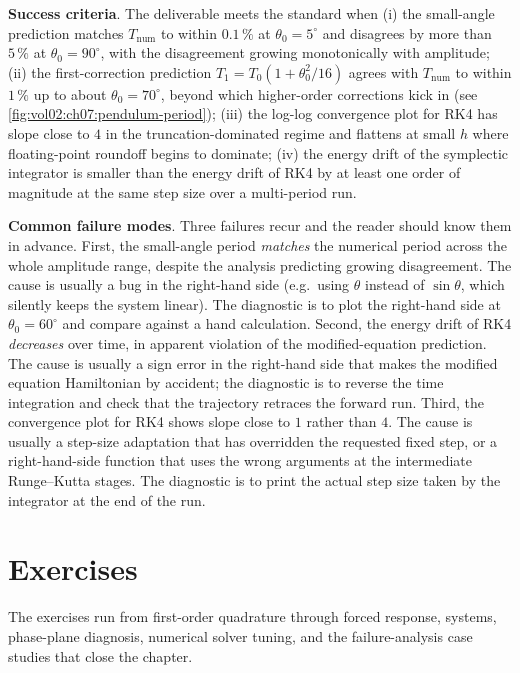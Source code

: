 \begin{project}
\textbf{Success criteria}. The deliverable meets the standard when
(i) the small-angle prediction matches $T_{\text{num}}$ to within
$0.1\,\%$ at $\theta_{0} = 5^{\circ}$ and disagrees by more than
$5\,\%$ at $\theta_{0} = 90^{\circ}$, with the disagreement growing
monotonically with amplitude; (ii) the first-correction prediction
$T_{1} = T_{0}(1 + \theta_{0}^{2}/16)$ agrees with $T_{\text{num}}$
to within $1\,\%$ up to about $\theta_{0} = 70^{\circ}$, beyond
which higher-order corrections kick in (see \cref{fig:vol02:ch07:pendulum-period});
(iii) the log-log convergence plot for RK4 has slope close to $4$
in the truncation-dominated regime and flattens at small $h$ where
floating-point roundoff begins to dominate; (iv) the energy drift
of the symplectic integrator is smaller than the energy drift of
RK4 by at least one order of magnitude at the same step size
over a multi-period run.

\textbf{Common failure modes}. Three failures recur and the reader
should know them in advance. First, the small-angle period
\emph{matches} the numerical period across the whole amplitude
range, despite the analysis predicting growing disagreement. The
cause is usually a bug in the right-hand side (e.g.\ using $\theta$
instead of $\sin\theta$, which silently keeps the system linear).
The diagnostic is to plot the right-hand side at $\theta_{0} =
60^{\circ}$ and compare against a hand calculation. Second, the
energy drift of RK4 \emph{decreases} over time, in apparent
violation of the modified-equation prediction. The cause is
usually a sign error in the right-hand side that makes the
modified equation Hamiltonian by accident; the diagnostic is to
reverse the time integration and check that the trajectory retraces
the forward run. Third, the convergence plot for RK4 shows slope
close to $1$ rather than $4$. The cause is usually a step-size
adaptation that has overridden the requested fixed step, or a
right-hand-side function that uses the wrong arguments at the
intermediate Runge--Kutta stages. The diagnostic is to print the
actual step size taken by the integrator at the end of the run.
\end{project}

\section{Exercises}

The exercises run from first-order quadrature through forced
response, systems, phase-plane diagnosis, numerical solver tuning,
and the failure-analysis case studies that close the chapter.

